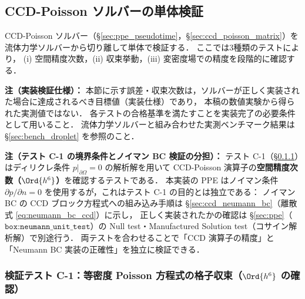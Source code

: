 \subsection{CCD-Poisson ソルバーの単体検証}
\label{sec:ccd_poisson_verification}

CCD-Poisson ソルバー（§\ref{sec:ppe_pseudotime}，§\ref{sec:ccd_poisson_matrix}）を
流体力学ソルバーから切り離して単体で検証する．
ここでは3種類のテストにより，
(i) 空間精度次数，(ii) 収束挙動，(iii) 変密度場での精度を段階的に確認する．

\noindent\textbf{注（実装検証仕様）：}
本節に示す誤差・収束次数は，ソルバーが正しく実装された場合に達成されるべき目標値（実装仕様）であり，
本稿の数値実験から得られた実測値ではない．
各テストの合格基準を満たすことを実装完了の必要条件として用いること．
流体力学ソルバーと組み合わせた実測ベンチマーク結果は §\ref{sec:bench_droplet} を参照のこと．

\noindent\textbf{注（テスト C-1 の境界条件とノイマン BC 検証の分担）：}
テスト C-1（§\ref{sec:ccd_test_c1}）はディリクレ条件 $p|_{\partial\Omega}=0$ の解析解を用いて
CCD-Poisson 演算子の\textbf{空間精度次数（$\Ord{h^6}$）}を確認するテストである．
本実装の PPE はノイマン条件 $\partial p/\partial n = 0$ を使用するが，これはテスト C-1 の目的とは独立である：
ノイマン BC の CCD ブロック方程式への組み込み手順は §\ref{sec:ccd_neumann_bc}（離散式 \eqref{eq:neumann_bc_ccd}）に示し，
正しく実装されたかの確認は §\ref{sec:ppe}（$\texttt{box:neumann\_unit\_test}$）の
Null test・Manufactured Solution test（コサイン解析解）で別途行う．
両テストを合わせることで「CCD 演算子の精度」と「Neumann BC 実装の正確性」を独立に検証できる．

\subsubsection{検証テスト C-1：等密度 Poisson 方程式の格子収束（\texorpdfstring{$\Ord{h^6}$}{O(h\textasciicircum 6)} の確認）}
\label{sec:ccd_test_c1}

